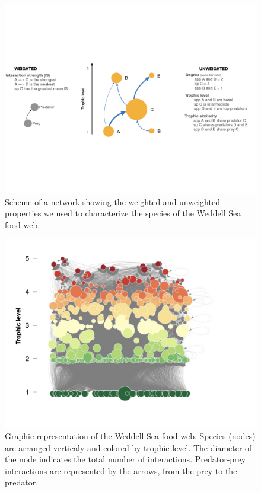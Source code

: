 \documentclass[gc, manuscript]{copernicus}
\begin{document}
\clearpage

\begin{figure}
\includegraphics[width=12cm]{ToyFoodWeb} \caption{Scheme of a network showing the weighted and unweighted properties we used to characterize the species of the Weddell Sea food web.}\label{fig:unnamed-chunk-2}
\end{figure}

\clearpage

\begin{figure}
\includegraphics[width=12cm]{WeddellSea_net} \caption{Graphic representation of the Weddell Sea food web. Species (nodes) are arranged verticaly and colored by trophic level. The diameter of the node indicates the total number of interactions. Predator-prey interactions are represented by the arrows, from the prey to the predator.}\label{fig:unnamed-chunk-3}
\end{figure}
\end{document}
